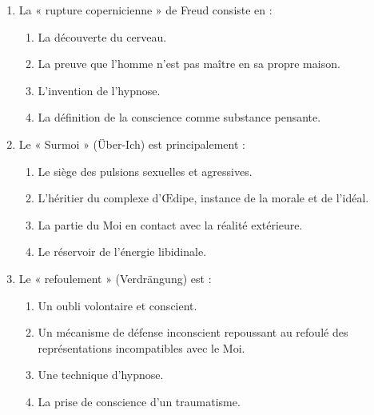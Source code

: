 \documentclass[11pt]{article}
\begin{document}
\begin{exercice}
\begin{enumerate}
    \item La « rupture copernicienne » de Freud consiste en :
    \begin{enumerate}
        \item La découverte du cerveau.
        \item La preuve que l'homme n'est pas maître en sa propre maison.
        \item L'invention de l'hypnose.
        \item La définition de la conscience comme substance pensante.
    \end{enumerate}
    \item Le « Surmoi » (Über-Ich) est principalement :
    \begin{enumerate}
        \item Le siège des pulsions sexuelles et agressives.
        \item L'héritier du complexe d'Œdipe, instance de la morale et de l'idéal.
        \item La partie du Moi en contact avec la réalité extérieure.
        \item Le réservoir de l'énergie libidinale.
    \end{enumerate}
    \item Le « refoulement » (Verdrängung) est :
    \begin{enumerate}
        \item Un oubli volontaire et conscient.
        \item Un mécanisme de défense inconscient repoussant au refoulé des représentations incompatibles avec le Moi.
        \item Une technique d'hypnose.
        \item La prise de conscience d'un traumatisme.
    \end{enumerate}
\end{enumerate}
\end{exercice}
\end{document}
